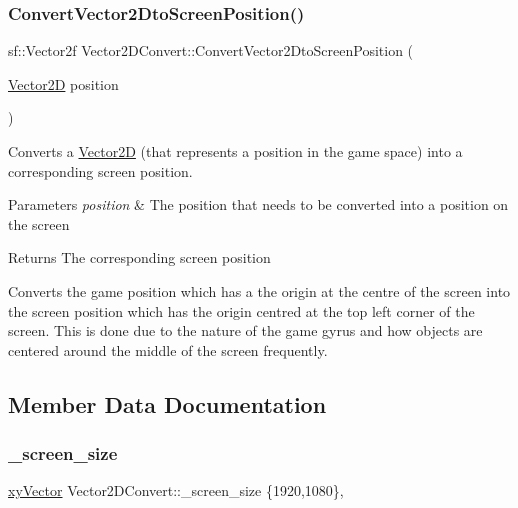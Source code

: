 \subsubsection{\texorpdfstring{Convert\+Vector2\+Dto\+Screen\+Position()}{ConvertVector2DtoScreenPosition()}}
{\footnotesize\ttfamily sf\+::\+Vector2f Vector2\+D\+Convert\+::\+Convert\+Vector2\+Dto\+Screen\+Position (\begin{DoxyParamCaption}\item[{\hyperlink{class_vector2_d}{Vector2D}}]{position }\end{DoxyParamCaption})\hspace{0.3cm}{\ttfamily [static]}}



Converts a \hyperlink{class_vector2_d}{Vector2D} (that represents a position in the game space) into a corresponding screen position. 


\begin{DoxyParams}{Parameters}
{\em position} & The position that needs to be converted into a position on the screen \\
\hline
\end{DoxyParams}
\begin{DoxyReturn}{Returns}
The corresponding screen position
\end{DoxyReturn}
Converts the game position which has a the origin at the centre of the screen into the screen position which has the origin centred at the top left corner of the screen. This is done due to the nature of the game gyrus and how objects are centered around the middle of the screen frequently. 

\subsection{Member Data Documentation}
\mbox{\label{class_vector2_d_convert_a6eef0a8081bf94301b98332ef362be2c}} 
\subsubsection{\texorpdfstring{\+\_\+screen\+\_\+size}{\_screen\_size}}
{\footnotesize\ttfamily \hyperlink{structxy_vector}{xy\+Vector} Vector2\+D\+Convert\+::\+\_\+screen\+\_\+size \{1920,1080\}\hspace{0.3cm}{\ttfamily [static]}, {\ttfamily [private]}}

